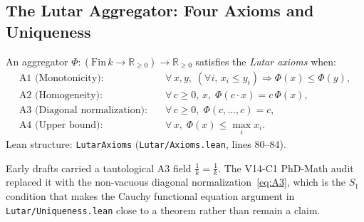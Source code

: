 \subsection{The Lutar Aggregator: Four Axioms and Uniqueness}
\label{subsec:aggregator}

\begin{definition}
\label{def:lutar-axioms}
An aggregator $\Phi \colon (\mathrm{Fin}\,k \to \mathbb{R}_{\ge 0})
\to \mathbb{R}_{\ge 0}$ satisfies the \emph{Lutar axioms} when:
\begin{align}
  \text{A1 (Monotonicity):}&\quad
    \forall\,x,y,\;
    (\forall i,\, x_i \le y_i) \Rightarrow \Phi(x) \le \Phi(y),
    \label{eq:A1}\\
  \text{A2 (Homogeneity):}&\quad
    \forall\,c \ge 0,\,x,\;
    \Phi(c \cdot x) = c\,\Phi(x),
    \label{eq:A2}\\
  \text{A3 (Diagonal normalization):}&\quad
    \forall\,c \ge 0,\;
    \Phi(c,\ldots,c) = c,
    \label{eq:A3}\\
  \text{A4 (Upper bound):}&\quad
    \forall\,x,\;
    \Phi(x) \le \max_i x_i.
    \label{eq:A4}
\end{align}
\textup{Lean structure:} \texttt{LutarAxioms}
(\texttt{Lutar/Axioms.lean}, lines 80--84).
\end{definition}

\begin{remark}
\label{rem:a3-fix}
Early drafts carried a tautological A3 field $\tfrac{1}{k} = \tfrac{1}{k}$.
The V14-C1 PhD-Math audit replaced it with the non-vacuous diagonal
normalization~\eqref{eq:A3}, which is the $S_1$ condition that makes the
Cauchy functional equation argument in \texttt{Lutar/Uniqueness.lean}
close to a theorem rather than remain a claim.
\end{remark}


